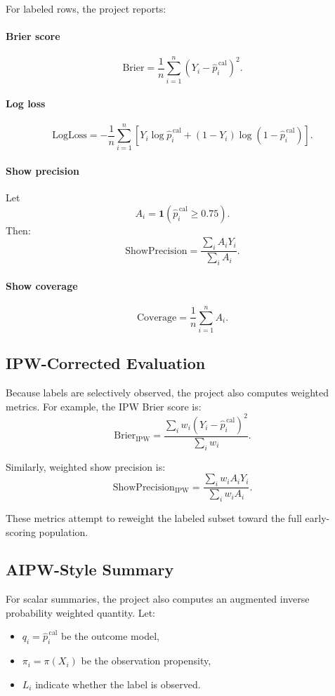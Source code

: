 \documentclass[11pt]{article}
\begin{document}
For labeled rows, the project reports:

\paragraph{Brier score}
\[
\text{Brier} = \frac{1}{n}\sum_{i=1}^n (Y_i - \hat{p}_i^{\,\text{cal}})^2.
\]

\paragraph{Log loss}
\[
\text{LogLoss}
= -\frac{1}{n}\sum_{i=1}^n
\left[
Y_i \log \hat{p}_i^{\,\text{cal}} + (1-Y_i)\log(1-\hat{p}_i^{\,\text{cal}})
\right].
\]

\paragraph{Show precision}
Let
\[
A_i = \mathbf{1}(\hat{p}_i^{\,\text{cal}} \ge 0.75).
\]
Then:
\[
\text{ShowPrecision} = \frac{\sum_i A_i Y_i}{\sum_i A_i}.
\]

\paragraph{Show coverage}
\[
\text{Coverage} = \frac{1}{n}\sum_{i=1}^n A_i.
\]

\subsection{IPW-Corrected Evaluation}

Because labels are selectively observed, the project also computes weighted metrics. For example, the IPW Brier score is:
\[
\text{Brier}_{\text{IPW}}
=
\frac{\sum_i w_i (Y_i - \hat{p}_i^{\,\text{cal}})^2}{\sum_i w_i}.
\]

Similarly, weighted show precision is:
\[
\text{ShowPrecision}_{\text{IPW}}
=
\frac{\sum_i w_i A_i Y_i}{\sum_i w_i A_i}.
\]

These metrics attempt to reweight the labeled subset toward the full early-scoring population.

\subsection{AIPW-Style Summary}

For scalar summaries, the project also computes an augmented inverse probability weighted quantity. Let:
\begin{itemize}[leftmargin=1.5em]
    \item $q_i = \hat{p}_i^{\,\text{cal}}$ be the outcome model,
    \item $\pi_i = \pi(X_i)$ be the observation propensity,
    \item $L_i$ indicate whether the label is observed.
\end{itemize}
\end{document}
